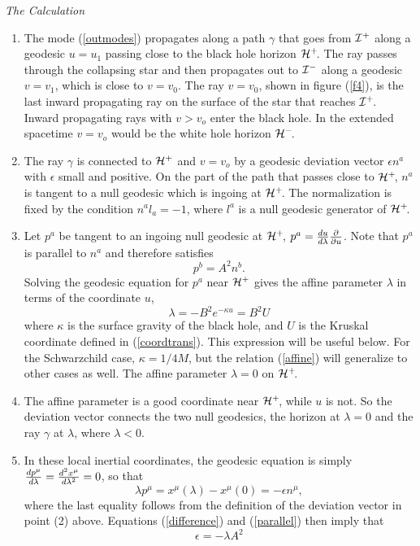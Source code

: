 \documentclass[12pt]{article}
\newcommand{\be}{\begin{equation}}
\newcommand{\ee}{\end{equation}}
\def\fh{{\cal H}^+}
\def\ph{{\cal H}^-}
\def\finf{{\cal I}^+}
\def\pinf{{\cal I}^-}
\begin{document}
\vskip 0.1in\noindent
{\it The Calculation}
\vskip 0.05in

\begin{enumerate}
\item The mode (\ref{outmodes})  propagates along a path $\gamma$ that
goes from $\finf$ along a geodesic $u=u_1$
passing close to the black hole horizon $\fh\!$. The ray passes through the
collapsing star and then propagates out to $\pinf$ along a geodesic $v=v_1$,
which is close to $v=v_0$. The ray $v=v_0$, shown in figure (\ref{f4}), is the
last inward
propagating ray on the surface of the star that reaches $\finf\!$. Inward
propagating rays
with  $v>v_o$ enter the black hole. In the extended spacetime $v=v_o$ would be
the white hole horizon $\ph\!$.

\item The ray $\gamma$ is connected to $\fh$ and $v=v_o$ by
a geodesic deviation vector $\epsilon n^a$ with $\epsilon $ small and
positive. On the
part of the path that passes close to $\fh\!$, $n^a$ is tangent to a null
geodesic which is
ingoing at $\fh\!$. The normalization is fixed by the condition $n^a l_a
=-1$, where
$l^a$ is a null geodesic generator of $\fh\!$.

\item Let $p^a$ be tangent to an ingoing null geodesic at $\fh\!$,
$p^a = {du\over d\lambda}{\partial \over \partial u}$. Note that $p^a$ is
parallel to $n^a$ and therefore satisfies
%
\be\label{parallel}p^b=A^2 n^b.\ee
%
Solving the geodesic equation for $p^a$ near $\fh$ gives the affine parameter
$\lambda$ in terms of the coordinate $u$,
%
\be\label{affine}\lambda =-B^2 e^{-\kappa u} =B^2 U \ee
%
where $\kappa$ is the surface gravity of the black hole, and $U$ is the
Kruskal coordinate defined in (\ref{coordtrans}).  This expression will be
useful below.
For the Schwarzchild case, $\kappa =1/4M$, but the relation (\ref{affine})
will generalize to
other cases as well. The affine parameter $\lambda =0$ on $\fh\!$.

\item The affine parameter is a good coordinate near $\fh\!$, while $u$ is not.
So the
deviation vector connects the two null geodesics, the horizon at $\lambda
=0$ and
the ray $\gamma$ at $\lambda$, where $\lambda <0$.

\item In these local inertial coordinates, the geodesic equation is simply
${dp^\mu \over d\lambda} ={d^2 x^\mu\over d\lambda ^2}=0$, so that
%
\be\label{difference} \lambda p^\mu =x^\mu (\lambda ) -x^\mu (0) =-\epsilon
n^\mu,\ee
%
where the last equality follows from the definition of the deviation
vector in point (2) above.  Equations (\ref{difference})  and
(\ref{parallel}) then imply that
%
\be\label{eps}\epsilon =-\lambda A^2\ee
%


\end{enumerate}
\end{document}
